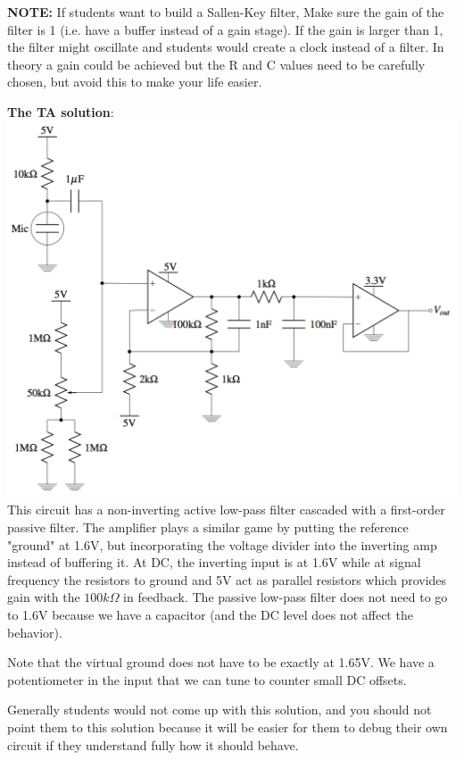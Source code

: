 \documentclass[11pt]{article}
\begin{document}
\textbf{NOTE:} If students want to build a Sallen-Key filter, Make sure the gain of the filter is 1 (i.e. have a buffer instead of a gain stage). If the gain is larger than 1, the filter might oscillate and students would create a clock instead of a filter. In theory a gain could be achieved but the R and C values need to be carefully chosen, but avoid this to make your life easier.

\textbf{The TA solution}: 
\includegraphics[width=\linewidth]{../proj-fe.png}
This circuit has a non-inverting active low-pass filter cascaded with a first-order passive filter. The amplifier plays a similar game by putting the reference "ground" at 1.6V, but incorporating the voltage divider into the inverting amp instead of buffering it. At DC, the inverting input is at 1.6V while at signal frequency the resistors to ground and 5V act as parallel resistors which provides gain with the $100k\Omega$ in feedback. The passive low-pass filter does not need to go to 1.6V because we have a capacitor (and the DC level does not affect the behavior).

Note that the virtual ground does not have to be exactly at 1.65V. We have a potentiometer in the input that we can tune to counter small DC offsets.

Generally students would not come up with this solution, and you should not point them to this solution because it will be easier for them to debug their own circuit if they understand fully how it should behave.
\end{document}
